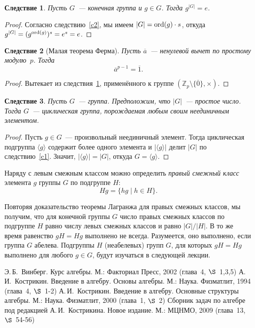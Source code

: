 \documentclass[a4paper,10pt]{amsart}
\def\ZZ{{\mathbb Z}}%
\def\ord{{\rm ord}}%
\def\ord{{\rm ord}}
\def\ord{{\rm ord}}
\newtheorem{corollary}{Следствие}
\theoremstyle{definition}
\theoremstyle{remark}
\begin{document}
\begin{corollary} \label{c3}
Пусть $G$~--- конечная группа и $g\in G$. Тогда $g^{|G|}=e$.
\end{corollary}

\begin{proof}
Согласно следствию~\ref{c2}, мы имеем $|G|=\ord(g) \cdot s$, откуда
$g^{|G|}=(g^{\ord(g)})^s=e^s=e$.
\end{proof}

\begin{corollary}[Малая теорема Ферма] \label{c4}
Пусть $\overline{a}$~--- ненулевой вычет по простому модулю~$p$.
Тогда
$$
\overline{a}^{p-1}=\overline{1}.
$$
\end{corollary}

\begin{proof}
Вытекает из следствия~\ref{c3}, применённого к группе
$(\ZZ_p\setminus\{\overline 0\},\times)$.
\end{proof}

\begin{corollary} \label{c5}
Пусть $G$~--- группа. Предположим, что $|G|$~--- простое число.
Тогда $G$~--- циклическая группа, порождаемая любым своим
неединичным элементом.
\end{corollary}

\begin{proof}
Пусть $g\in G$~--- произвольный неединичный элемент. Тогда
циклическая подгруппа $\langle g\rangle$ содержит более одного
элемента и $|\langle g\rangle|$ делит $|G|$ по следствию~\ref{c1}.
Значит, $|\langle g\rangle|=|G|$, откуда $G=\langle g\rangle$.
\end{proof}

Наряду с левым смежным классом можно определить {\it правый смежный
класс} элемента $g$ группы $G$ по подгруппе $H$:
$$
Hg=\{hg \mid h\in H\}.
$$

Повторяя доказательство теоремы Лагранжа для правых смежных классов,
мы получим, что для конечной группы $G$ число правых смежных классов
по подгруппе $H$ равно числу левых смежных классов и равно
$|G|/|H|$. В то же время равенство $gH=Hg$ выполнено не всегда.
Разумеется, оно выполнено, если группа $G$ абелева. Подгруппы $H$
(неабелевых) групп $G$, для которых $gH=Hg$ выполнено для любого
$g\in G$, будут изучаться в следующей лекции.

\bigskip

\begin{thebibliography}{99}
Э.\,Б.~Винберг. Курс алгебры. М.: Факториал Пресс, 2002 (глава~4,
$\S$~1,3,5)
А.\,И.~Кострикин. Введение в алгебру. Основы алгебры. М.: Наука.
Физматлит, 1994 (глава~4, $\S$~1-2)
А.\,И.~Кострикин. Введение в алгебру. Основные структуры алгебры.
М.: Наука. Физматлит, 2000 (глава~1, $\S$~2)
Сборник задач по алгебре под редакцией А.\,И.~Кострикина. Новое
издание. М.: МЦНМО, 2009 (глава~13, $\S$~54-56)
\end{thebibliography}
\end{document}
